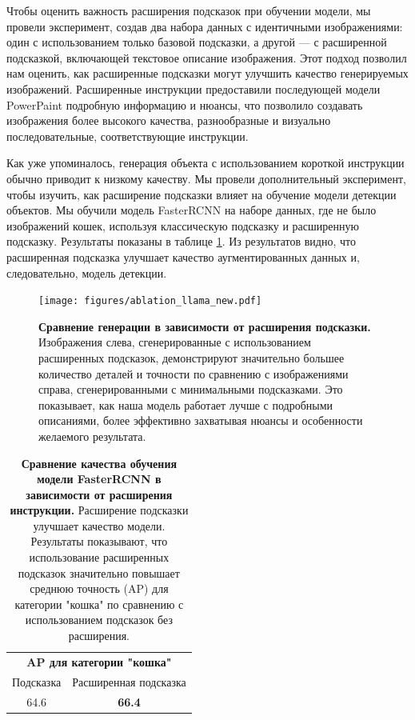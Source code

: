 \documentclass[11pt]{article}
\begin{document}
Чтобы оценить важность расширения подсказок при обучении модели, мы провели эксперимент, создав два набора данных с идентичными изображениями: один с использованием только базовой подсказки, а другой — с расширенной подсказкой, включающей текстовое описание изображения. Этот подход позволил нам оценить, как расширенные подсказки могут улучшить качество генерируемых изображений. Расширенные инструкции предоставили последующей модели PowerPaint подробную информацию и нюансы, что позволило создавать изображения более высокого качества, разнообразные и визуально последовательные, соответствующие инструкции.

Как уже упоминалось, генерация объекта с использованием короткой инструкции обычно приводит к низкому качеству. Мы провели дополнительный эксперимент, чтобы изучить, как расширение подсказки влияет на обучение модели детекции объектов. Мы обучили модель FasterRCNN на наборе данных, где не было изображений кошек, используя классическую подсказку и расширенную подсказку. Результаты показаны в таблице \ref{fig:expanding_prompts}. Из результатов видно, что расширенная подсказка улучшает качество аугментированных данных и, следовательно, модель детекции.

\begin{figure}[h]
    \centering
    \texttt{[image: figures/ablation\_llama\_new.pdf]}
    \caption{\textbf{Сравнение генерации в зависимости от расширения подсказки.} Изображения слева, сгенерированные с использованием расширенных подсказок, демонстрируют значительно большее количество деталей и точности по сравнению с изображениями справа, сгенерированными с минимальными подсказками. Это показывает, как наша модель работает лучше с подробными описаниями, более эффективно захватывая нюансы и особенности желаемого результата.}
    \label{fig:expanding_prompts}
\end{figure}

\begin{table}[h]
        \centering
        \begin{tabular}{cc}
                \toprule
                \multicolumn{2}{c}{\textbf{AP для категории "кошка"}} \\
                Подсказка & Расширенная подсказка   \\
                \midrule
                  64.6  &  \textbf{66.4} \\ %
                  \bottomrule
        \end{tabular}
        \caption{\textbf{Сравнение качества обучения модели FasterRCNN в зависимости от расширения инструкции.} Расширение подсказки улучшает качество модели. Результаты показывают, что использование расширенных подсказок значительно повышает среднюю точность (AP) для категории "кошка" по сравнению с использованием подсказок без расширения.}
        \label{tab:prompt_expanding}
        
\end{table}
\end{document}
